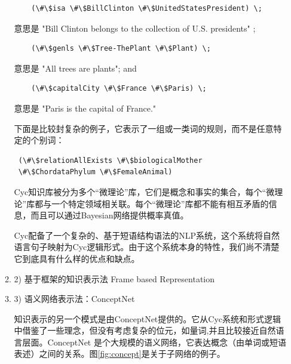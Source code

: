 \begin{enumerate}
\begin{enumerate}
 {\tt\begin{small}\begin{lstlisting}
    (\#\$isa \#\$BillClinton \#\$UnitedStatesPresident) \;
    \end{lstlisting}\end{small}}

\noindent 意思是 "Bill Clinton belongs to the collection of U.S. presidents" ;

 {\tt\begin{small}\begin{lstlisting}
    (\#\$genls \#\$Tree-ThePlant \#\$Plant) \;
    \end{lstlisting}\end{small}}

\noindent 意思是 "All trees are plants"; and

 {\tt\begin{small}\begin{lstlisting}
    (\#\$capitalCity \#\$France \#\$Paris) \;
    \end{lstlisting}\end{small}}

\noindent 意思是 "Paris is the capital of France."


下面是比较封复杂的例子，它表示了一组或一类词的规则，而不是任意特定的个别词：

 {\tt\begin{small}\begin{lstlisting}
 (\#\$relationAllExists \#\$biologicalMother
 \#\$ChordataPhylum \#\$FemaleAnimal)
    \end{lstlisting}\end{small}}


Cyc知识库被分为多个“微理论”库，它们是概念和事实的集合，每个“微理论”库都与一个特定领域相关联。每个“微理论”库都不能有相互矛盾的信息，而且可以通过Bayesian网络提供概率真值。

Cyc配备了一个复杂的、基于短语结构语法的NLP系统，这个系统将自然语言句子映射为Cyc逻辑形式。由于这个系统本身的特性，我们尚不清楚它到底具有什么样的优点和缺点。

\item2) 基于框架的知识表示法 Frame based Representation

\item3) 语义网络表示法：ConceptNet

知识表示的另一个模式是由ConceptNet提供的\cite{Liu2004}。它从Cyc系统和形式逻辑中借鉴了一些理念，但没有考虑复杂的位元，如量词,并且比较接近自然语言层面。ConceptNet 是个大规模的语义网络，它表达概念（由单词或短语表述）之间的关系。图\ref{fig:concept}是关于子网络的例子。


\end{enumerate}
\end{enumerate}
